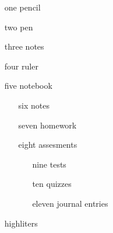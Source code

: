 \documentclass[11pt]{article}
\begin{document}
\begin{enumerate}
\item[one] pencil
\item[two] pen
\item[three] notes
\item[four] ruler
\item[five] notebook
	\begin{enumerate}
	\item[six] notes
	\item[seven] homework
	\item[eight] assesments
		\begin{enumerate}
		\item[nine] tests
		\item[ten] quizzes
		\item[eleven] journal entries
		\end{enumerate}
	\end{enumerate}
\item[] highliters
\end{enumerate}
\end{document}
